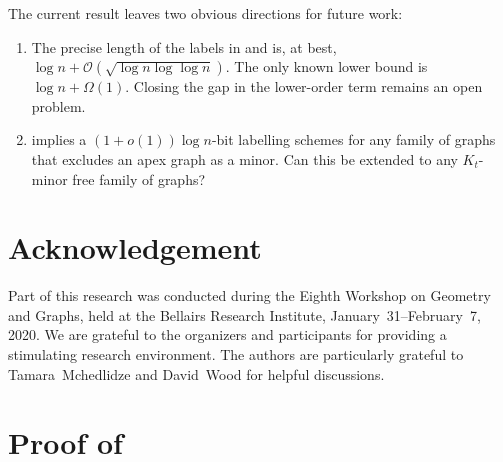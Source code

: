 \documentclass[kpfonts]{patmorin}
\newcommand{\Oh}{\mathcal{O}}
\begin{document}
%


The current result leaves two obvious directions for future work:
\begin{enumerate}

\item The precise length of the labels in  and  is, at best, $\log{n} + \Oh(\sqrt{\log{n}\log\log{n}})$. The only known lower bound is $\log{n} + \Omega(1)$. Closing the gap in the lower-order term remains an open problem.

\item {} implies a $(1+o(1))\log{n}$-bit labelling schemes for any family of graphs that excludes an apex graph as a minor.  Can this be extended to any $K_t$-minor free family of graphs?

\end{enumerate}

\section*{Acknowledgement}

Part of this research was conducted during the Eighth Workshop on Geometry and Graphs, held at the Bellairs Research Institute, January~31--February~7, 2020.  We are grateful to the organizers and participants for providing a stimulating research environment.  The authors are particularly grateful to Tamara~Mchedlidze and David~Wood for helpful discussions.





\newpage
\appendix

\section{Proof of }
\end{document}

